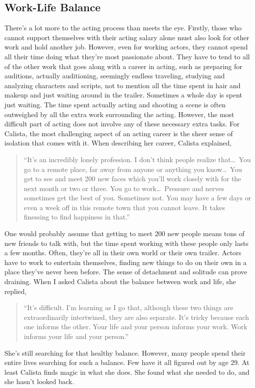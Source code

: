 \begin{multicols}{2}
\section{Work-Life Balance}
		There’s a lot more to the acting process than meets the eye. Firstly, those who cannot support themselves with their acting salary alone must also look for other work and hold another job. However, even for working actors, they cannot spend all their time doing what they’re most passionate about. They have to tend to all of the other work that goes along with a career in acting, such as preparing for auditions, actually auditioning, seemingly endless traveling, studying and analyzing characters and scripts, not to mention all the time spent in hair and makeup and just waiting around in the trailer. Sometimes a whole day is spent just waiting. The time spent actually acting and shooting a scene is often outweighed by all the extra work surrounding the acting. However, the most difficult part of acting does not involve any of these necessary extra tasks. For Calista, the most challenging aspect of an acting career is the sheer sense of isolation that comes with it. When describing her career, Calista explained,
		\begin{quote}
			“It's an incredibly lonely profession. I don't think people realize that\ldots\ You go to a remote place, far away from anyone or anything you know\ldots\ You get to see and meet 200 new faces which you'll work closely with for the next month or two or three. You go to work\ldots\ Pressure and nerves sometimes get the best of you. Sometimes not. You may have a few days or even a week off in this remote town that you cannot leave. It takes finessing to find happiness in that.”
		\end{quote}
		One would probably assume that getting to meet 200 new people means tons of new friends to talk with, but the time spent working with these people only lasts a few months. Often, they’re all in their own world or their own trailer. Actors have to work to entertain themselves, finding new things to do on their own in a place they’ve never been before. The sense of detachment and solitude can prove draining. When I asked Calista about the balance between work and life, she replied,
		\begin{quote}
			“It's difficult. I'm learning as I go that, although these two things are extraordinarily intertwined, they are also separate. It's tricky because each one informs the other. Your life and your person informs your work. Work informs your life and your person.”
		\end{quote}
		She’s still searching for that healthy balance. However, many people spend their entire lives searching for such a balance. Few have it all figured out by age 29. At least Calista finds magic in what she does. She found what she needed to do, and she hasn’t looked back. 
\end{multicols}